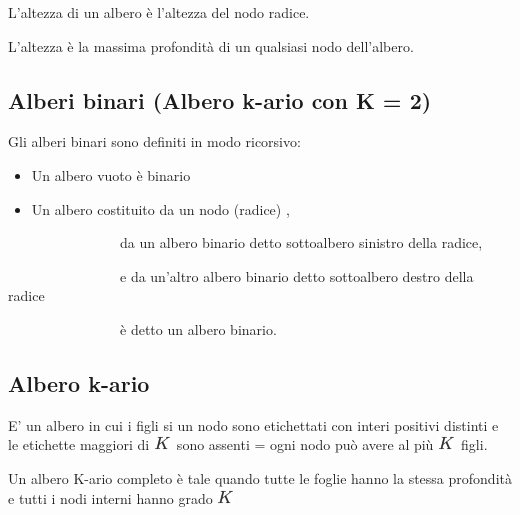 \documentclass{article}
\providecommand{\tightlist}{%
  \setlength{\itemsep}{0pt}\setlength{\parskip}{0pt}}
\begin{document}
{L'altezza di un albero è l'altezza del nodo radice.}

{L'altezza è la massima profondità di un qualsiasi nodo dell'albero.}

{}

\hypertarget{h.rmzlh8kpnju}{\subsection{\texorpdfstring{{Alberi binari
(Albero k-ario con K =
2)}}{Alberi binari (Albero k-ario con K = 2)}}\label{h.rmzlh8kpnju}}

{}

{Gli alberi binari sono definiti in modo ricorsivo:}

\begin{itemize}
\tightlist
\item
  {Un albero vuoto è binario}
\item
  {Un albero costituito da un nodo (radice) ,}
\end{itemize}

{~~~~~~~~~~~~~~~~da un albero binario detto sottoalbero sinistro della
radice,}

{~~~~~~~~~~~~~~~~e da un'altro albero binario detto sottoalbero destro
della radice}

{~~~~~~~~~~~~~~~~è detto un albero binario.}

{}

\hypertarget{h.chua2o837in5}{\subsection{\texorpdfstring{{Albero
k-ario}}{Albero k-ario}}\label{h.chua2o837in5}}

{E' un albero in cui i figli si un nodo sono etichettati con interi
positivi distinti e le etichette maggiori di
}\includegraphics{images/image85.png}{~sono assenti = ogni nodo può
avere al più }\includegraphics{images/image85.png}{~figli.}

{}

{Un albero K-ario completo è tale quando tutte le foglie hanno la stessa
profondità e tutti i nodi interni hanno grado
}\includegraphics{images/image85.png}{~}
\end{document}
